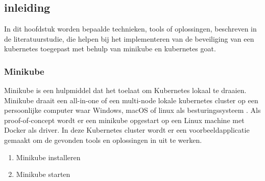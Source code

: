 
\chapter{}%
\label{ch:Proof-of-concept}

\section{inleiding}

In dit hoofdstuk worden bepaalde technieken, tools of oplossingen, beschreven in de literatuurstudie, die helpen bij het implementeren van de beveiliging van een kubernetes toegepast met behulp van minikube en kubernetes goat.

\subsection{Minikube}
Minikube is een hulpmiddel dat het toelaat om Kubernetes lokaal te draaien. Minikube draait een all-in-one of een multi-node lokale kubernetes cluster op een persoonlijke computer waar Windows, macOS of linux als besturingssysteem \autocite{KubernetesDocs-2023}. Als proof-of-concept wordt er een minikube opgestart op een Linux machine met Docker als driver. In deze Kubernetes cluster wordt er een voorbeeldapplicatie gemaakt om de gevonden tools en oplossingen in uit te werken. 

\begin{enumerate}
    \item Minikube installeren
    \item Minikube starten
\end{enumerate}

